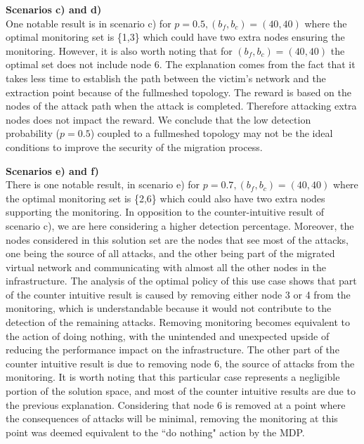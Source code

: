 \textbf{Scenarios c) and d)\\}
One notable result is in scenario c) for $p=0.5,  (b_f,b_c) = (40,40)$ where the optimal monitoring set is \{1,3\} which could have two extra nodes ensuring the monitoring. However, it is also worth noting that for $(b_f,b_c)=(40,40)$ the optimal set does not include node 6. The explanation comes from the fact that it takes less time to establish the path between the victim's network and the extraction point because of the fullmeshed topology. The reward is based on the nodes of the attack path when the attack is completed. Therefore attacking extra nodes does not impact the reward. We conclude that the low detection probability ($p=0.5$) coupled to a fullmeshed topology may not be the ideal conditions to improve the security of the migration process.


\textbf{Scenarios e) and f)}\\
There is one  notable result, in scenario e) for $p=0.7,  (b_f,b_c) = (40,40)$ where the optimal monitoring set is \{2,6\} which could also have two extra nodes supporting the monitoring. In opposition to the counter-intuitive result of scenario c), we are here considering a higher detection percentage. Moreover, the nodes considered in this solution set are the nodes that see most of the attacks, one being the source of all attacks, and the other being part of the migrated virtual network and communicating with almost all the other nodes in the infrastructure. The analysis of the optimal policy of this use case shows that part of the counter intuitive result is caused by removing either node 3 or 4 from the monitoring, which is understandable because it would not contribute to the detection of the remaining attacks. Removing monitoring becomes equivalent to the action of doing nothing, with the unintended and unexpected upside of reducing the performance impact on the infrastructure.
The other part of the counter intuitive result is due to removing node 6, the source of attacks from the monitoring. It is worth noting that this particular case represents a negligible portion of the solution space, and most of the counter intuitive results are due to the previous explanation. Considering that node 6 is removed at a point where the consequences of attacks will be minimal, removing the monitoring at this point was deemed equivalent to the ``do nothing" action by the MDP.


